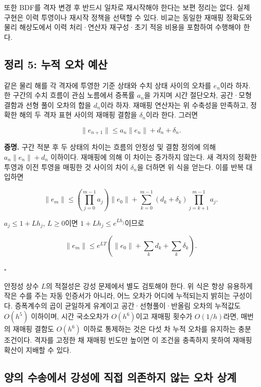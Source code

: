 \documentclass[
  10pt,
  a4paper,
]{article}
\begin{document}
또한 BDF를 격자 변경 후 반드시 일차로 재시작해야 한다는 보편 정리는
없다. 실제 구현은 이력 투영이나 재시작 정책을 선택할 수 있다. 비교는
동일한 재매핑 정확도와 물리 해상도에서 이력 처리·연산자 재구성·초기 적응
비용을 포함하여 수행해야 한다.

\hypertarget{uxc815uxb9ac-5-uxb204uxc801-uxc624uxcc28-uxc608uxc0b0}{%
\subsection{정리 5: 누적 오차
예산}\label{uxc815uxb9ac-5-uxb204uxc801-uxc624uxcc28-uxc608uxc0b0}}

같은 물리 해를 각 격자에 투영한 기준 상태와 수치 상태 사이의 오차를
\(e_n\)이라 하자. 한 구간의 수치 흐름이 관심 노름에서 증폭률 \(a_n\)을
가지며 시간 절단오차, 공간·모형 결함과 선형 풀이 오차의 합을 \(d_n\)이라
하자. 재매핑 연산자는 위 수축성을 만족하고, 정확한 해의 두 격자 표현
사이의 재매핑 결함을 \(\delta_n\)이라 한다. 그러면

\[
\|e_{n+1}\|\le a_n\|e_n\|+d_n+\delta_n.
\]

\textbf{증명.} 구간 적분 후 두 상태의 차이는 흐름의 안정성 및 결함
정의에 의해 \(a_n\|e_n\|+d_n\) 이하이다. 재매핑에 의해 이 차이는
증가하지 않는다. 새 격자의 정확한 투영과 이전 투영을 매핑한 것 사이의
차이 \(\delta_n\)을 더하면 위 식을 얻는다. 이를 반복 대입하면

\[
\|e_m\|\le
\left(\prod_{j=0}^{m-1}a_j\right)\|e_0\|
+\sum_{k=0}^{m-1}(d_k+\delta_k)
 \prod_{j=k+1}^{m-1}a_j.
\]

\(a_j\le1+Lh_j\), \(L\ge0\)이면 \(1+Lh_j\le e^{Lh_j}\)이므로

\[
\|e_m\|\le e^{LT}\left(\|e_0\|+\sum_kd_k+\sum_k\delta_k\right).
\]

\(\square\)

안정성 상수 \(L\)의 적절성은 강성 문제에서 별도 검토해야 한다. 위 식은
항상 유용하게 작은 수를 주는 자동 인증서가 아니라, 어느 오차가 어디에
누적되는지 밝히는 구성이다. 증폭계수의 곱이 균일하게 유계이고
공간·선형풀이·반올림 오차의 누적값도 \(O(h^5)\) 이하이며, 시간
국소오차가 \(O(h^6)\)이고 재매핑 횟수가 \(O(1/h)\)라면, 매번의 재매핑
결함도 \(O(h^6)\) 이하로 통제하는 것은 다섯 차 누적 오차를 유지하는
충분조건이다. 격자를 고정한 채 재매핑 빈도만 높이면 이 조건을 충족하지
못하여 재매핑 확산이 지배할 수 있다.

\hypertarget{uxc591uxc758-uxc218uxc1a1uxc5d0uxc11c-uxac15uxc131uxc5d0-uxc9c1uxc811-uxc758uxc874uxd558uxc9c0-uxc54auxb294-uxc624uxcc28-uxc0c1uxacc4}{%
\subsection{양의 수송에서 강성에 직접 의존하지 않는 오차
상계}\label{uxc591uxc758-uxc218uxc1a1uxc5d0uxc11c-uxac15uxc131uxc5d0-uxc9c1uxc811-uxc758uxc874uxd558uxc9c0-uxc54auxb294-uxc624uxcc28-uxc0c1uxacc4}}
\end{document}
